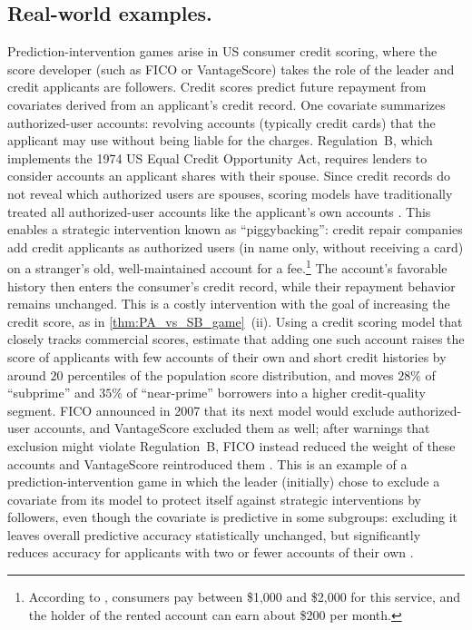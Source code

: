 \documentclass{article}
\begin{document}
\subsection{Real-world examples.}
Prediction-intervention games arise in US consumer credit scoring, where the
score developer (such as FICO or VantageScore) takes the role of the leader and credit applicants are
followers. Credit scores predict future repayment from covariates derived
from an applicant's credit record. One covariate summarizes
authorized-user accounts: revolving accounts (typically credit cards) that the applicant may use without being liable for the charges. Regulation~B, which
implements the 1974 US Equal Credit Opportunity Act, requires lenders to
consider accounts an applicant shares with their spouse. Since credit records do not reveal which authorized users are spouses,
scoring models have traditionally treated all authorized-user accounts like
the applicant's own accounts \citep{brevoort2013credit}. This enables a
strategic intervention known as ``piggybacking'': credit repair companies
add credit applicants as authorized users (in name only, without receiving
a card) on a stranger's old, well-maintained account for a fee.\footnote{According to \citet[Footnote~2]{brevoort2013credit}, consumers pay between \$1{,}000 and \$2{,}000 for this
service, and the holder of the rented account can earn about \$200 per
month.} The account's favorable
history then enters the consumer's credit record, while their repayment
behavior remains unchanged. This is a costly intervention with the goal of
increasing the credit score, as in \cref{thm:PA_vs_SB_game}~(ii).
Using a credit scoring model that closely tracks commercial scores,
\citet{brevoort2013credit} estimate that adding one such account raises the
score of applicants with few accounts of their own and short credit
histories by around $20$ percentiles of the population score distribution,
and moves $28\%$ of ``subprime'' and $35\%$ of ``near-prime'' borrowers into
a higher credit-quality segment. FICO
announced in 2007 that its next model would exclude authorized-user
accounts, and VantageScore excluded them as well; after warnings that
exclusion might violate Regulation~B, FICO instead reduced the weight of
these accounts and VantageScore reintroduced them \citep{brevoort2013credit}.
This is an example of a prediction-intervention game in which the leader
(initially) chose to exclude a covariate from its model to protect itself against
strategic interventions by followers, even though the covariate is
predictive in some subgroups: excluding it leaves overall predictive
accuracy statistically unchanged, but significantly reduces accuracy for
applicants with two or fewer accounts of their own \citep{brevoort2013credit}.
\end{document}
